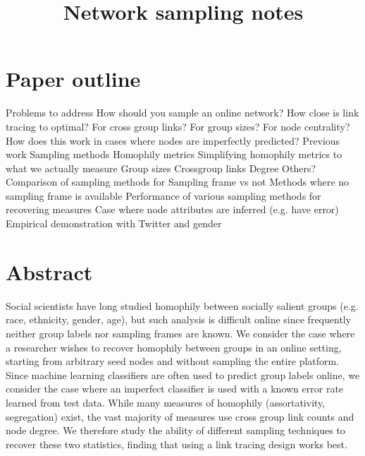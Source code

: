 \documentclass[a4paper]{article}
\title{Network sampling notes}
\author{}
\begin{document}
\maketitle



\section{Paper outline}

\begin{outline}[enumerate]
\1 Problems to address
	\2 How should you sample an online network?
    \2 How close is link tracing to optimal?
    	\3 For cross group links?
        \3 For group sizes?
        \3 For node centrality?
	\2 How does this work in cases where nodes are imperfectly predicted?
\1 Previous work
	\2 Sampling methods
    \2 Homophily metrics
\1 Simplifying homophily metrics to what we actually measure
	\2 Group sizes
    \2 Crossgroup links
    \2 Degree
    \2 Others?
\1 Comparison of sampling methods for
	\2 Sampling frame vs not
    \2 Methods where no sampling frame is available
\1 Performance of various sampling methods for recovering measures
\1 Case where node attributes are inferred (e.g. have error)
\1 Empirical demonstration with Twitter and gender

\end{outline}

\section{Abstract}

Social scientists have long studied homophily between socially salient groups (e.g. race, ethnicity, gender, age), but such analysis is difficult online since frequently neither group labels nor sampling frames are known. We consider the case where a researcher wishes to recover homophily between groups in an online setting, starting from arbitrary seed nodes and without sampling the entire platform. Since machine learning classifiers are often used to predict group labels online, we consider the case where an imperfect classifier is used with a known error rate learned from test data. While many measures of homophily (assortativity, segregation) exist, the vast majority of measures use cross group link counts and node degree. We therefore study the ability of different sampling techniques to recover these two statistics, finding that using a link tracing design works best.
\end{document}
